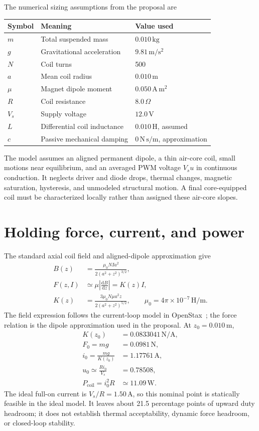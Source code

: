 \documentclass[11pt,letterpaper]{article}
\newcommand{\dd}{\mathrm d}
\begin{document}
The numerical sizing assumptions from the proposal are
\begin{center}
\begin{tabular}{lll}
\toprule
Symbol & Meaning & Value used \\
\midrule
\(m\) & Total suspended mass & \(0.010\,\mathrm{kg}\) \\
\(g\) & Gravitational acceleration & \(9.81\,\mathrm{m/s^2}\) \\
\(N\) & Coil turns & 500 \\
\(a\) & Mean coil radius & \(0.010\,\mathrm m\) \\
\(\mu\) & Magnet dipole moment & \(0.050\,\mathrm{A\,m^2}\) \\
\(R\) & Coil resistance & \(8.0\,\Omega\) \\
\(V_s\) & Supply voltage & \(12.0\,\mathrm V\) \\
\(L\) & Differential coil inductance & \(0.010\,\mathrm H\), assumed \\
\(c\) & Passive mechanical damping & \(0\,\mathrm{N\,s/m}\), approximation \\
\bottomrule
\end{tabular}
\end{center}
The model assumes an aligned permanent dipole, a thin air-core coil, small
motions near equilibrium, and an averaged PWM voltage \(V_su\) in continuous
conduction. It neglects driver and diode drops, thermal changes, magnetic
saturation, hysteresis, and unmodeled structural motion. A final core-equipped
coil must be characterized locally rather than assigned these air-core slopes.

\section{Holding force, current, and power}
The standard axial coil field and aligned-dipole approximation give
\begin{align}
 B(z)&=\frac{\mu_0NIa^2}{2(a^2+z^2)^{3/2}},\\
 F(z,I)&\simeq \mu\left|\frac{\dd B}{\dd z}\right|=K(z)I,\\
 K(z)&=\frac{3\mu_0N\mu a^2z}{2(a^2+z^2)^{5/2}},
 \qquad \mu_0=4\pi\times10^{-7}\,\mathrm{H/m}.
\end{align}
The field expression follows the current-loop model in
OpenStax~\cite{openstax}; the force relation is the dipole approximation
used in the proposal. At \(z_0=0.010\,\mathrm m\),
\begin{align}
 K(z_0)&=0.0833041\,\mathrm{N/A},\\
 F_0=mg&=0.0981\,\mathrm N,\\
 i_0=\frac{mg}{K(z_0)}&=1.17761\,\mathrm A,\\
 u_0\simeq\frac{Ri_0}{V_s}&=0.78508,\\
 P_{\mathrm{coil}}=i_0^2R&\simeq11.09\,\mathrm W.
\end{align}
The ideal full-on current is \(V_s/R=1.50\,\mathrm A\), so this nominal
point is statically feasible in the ideal model. It leaves about 21.5
percentage points of upward duty headroom; it does not establish thermal
acceptability, dynamic force headroom, or closed-loop stability.
\end{document}
